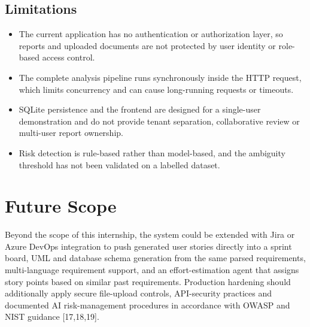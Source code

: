 \clearpage
\subsection{Limitations}
\begin{itemize}[leftmargin=*]
\item The current application has no authentication or authorization layer,
  so reports and uploaded documents are not protected by user identity or
  role-based access control.
\item The complete analysis pipeline runs synchronously inside the HTTP
  request, which limits concurrency and can cause long-running requests or
  timeouts.
\item SQLite persistence and the frontend are designed for a single-user
  demonstration and do not provide tenant separation, collaborative review
  or multi-user report ownership.
\item Risk detection is rule-based rather than model-based, and the
  ambiguity threshold has not been validated on a labelled dataset.
\end{itemize}

\section{Future Scope}
Beyond the scope of this internship, the system could be extended with Jira
or Azure DevOps integration to push generated user stories directly into a
sprint board, UML and database schema generation from the same parsed
requirements, multi-language requirement support, and an effort-estimation
agent that assigns story points based on similar past requirements.
Production hardening should additionally apply secure file-upload controls,
API-security practices and documented AI risk-management procedures in
accordance with OWASP and NIST guidance [17,18,19].

